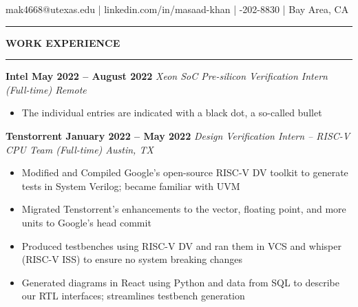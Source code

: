 \documentclass[12pt, a4paper]{article}
\begin{document}
%
\vspace{-0.2mm}\newline
%
{\fontsize{16}{19}\selectfont mak4668@utexas.edu} |
{\fontsize{16}{19}\selectfont linkedin.com/in/masaad-khan} |
{\fontsize{16}{19}-202-8830} |
{\fontsize{16}{19}\selectfont Bay Area, CA}\newline
%
\vspace{-8.0mm}\newline
\rule{18.5cm}{0.4pt}
\vspace{-0.9cm}\newline
\newline
%
%
\textbf{{\fontsize{12}{14}\selectfont WORK EXPERIENCE}}
\vspace{-3.8mm}\newline
\rule{18.5cm}{0.4pt}
%
%
\textbf{{\fontsize{12}{14}\selectfont Intel \hfill May 2022 – August 2022}}\newline
\emph{Xeon SoC Pre-silicon Verification Intern (Full-time) \hfill Remote} \\
\vspace{-8.5mm}
\begin{itemize}
  \item The individual entries are indicated with a black dot, a so-called bullet
\end{itemize}
%
%
\textbf{{\fontsize{12}{14}\selectfont Tenstorrent \hfill January 2022 – May 2022}}\newline
\emph{Design Verification Intern – RISC-V CPU Team (Full-time) \hfill Austin, TX}\newline
\vspace{-\topsep}
\begin{itemize}
  \setlength{\itemindent}{-6mm}
  \vspace{-0.2cm}\item Modified and Compiled Google’s open-source RISC-V DV toolkit to generate tests in System Verilog; became familiar with UVM
  \vspace{-0.2cm}\item Migrated Tenstorrent’s enhancements to the vector, floating point, and more units to Google’s head commit
  \vspace{-0.2cm}\item Produced testbenches using RISC-V DV and ran them in VCS and whisper (RISC-V ISS) to ensure no system breaking changes
  \vspace{-0.2cm}\item Generated diagrams in React using Python and data from SQL to describe our RTL interfaces; streamlines testbench generation
\end{itemize}
\end{document}
